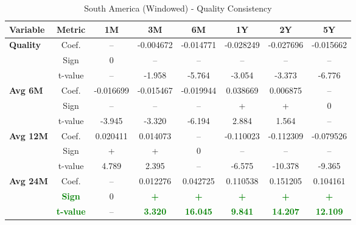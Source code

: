 \documentclass[11pt,english,a4paper,hidelinks]{book}
\begin{document}
\begin{table}[H]
    \centering
    \caption{South America (Windowed) - Quality Consistency}
    \begin{tabular}{lccccccc}
        \toprule
        \textbf{Variable} & \textbf{Metric} & \textbf{1M} & \textbf{3M} & \textbf{6M} & \textbf{1Y} & \textbf{2Y} & \textbf{5Y} \\
        \midrule
        \multirow{3}{*}{\textbf{Quality}}
            & Coef.   & --        & -0.004672 & -0.014771 & -0.028249 & -0.027696 & -0.015662 \\
            & Sign    & 0         & –         & –         & –         & –         & –         \\
            & t-value & --        & -1.958    & -5.764    & -3.054    & -3.373    & -6.776    \\
        \cmidrule{1-8}
        \multirow{3}{*}{\textbf{Avg 6M}}
            & Coef.   & -0.016699 & -0.015467 & -0.019944 & 0.038669  & 0.006875  & --        \\
            & Sign    & –         & –         & –         & +         & +         & 0         \\
            & t-value & -3.945    & -3.320    & -6.194    & 2.884     & 1.564     & --        \\
        \cmidrule{1-8}
        \multirow{3}{*}{\textbf{Avg 12M}}
            & Coef.   & 0.020411  & 0.014073  & --        & -0.110023 & -0.112309 & -0.079526 \\
            & Sign    & +         & +         & 0         & –         & –         & –         \\
            & t-value & 4.789     & 2.395     & --        & -6.575    & -10.378   & -9.365    \\
        \cmidrule{1-8}
        \multirow{3}{*}{\textbf{Avg 24M}}
            & Coef.   & --        & 0.012276  & 0.042725  & 0.110538  & 0.151205  & 0.104161  \\
            & \textbf{\textcolor{green}{Sign}}    & 0         & \textbf{\textcolor{green}{+}}         & \textbf{\textcolor{green}{+}}         & \textbf{\textcolor{green}{+}}         & \textbf{\textcolor{green}{+}}         & \textbf{\textcolor{green}{+}}         \\
            & \textbf{\textcolor{green}{t-value}} & --        & \textbf{\textcolor{green}{3.320}}     & \textbf{\textcolor{green}{16.045}}    & \textbf{\textcolor{green}{9.841}}     & \textbf{\textcolor{green}{14.207}}    & \textbf{\textcolor{green}{12.109}}    \\
        \bottomrule
    \end{tabular}
    \label{tab:south_america_quality_consistency}
\end{table}
\end{document}
